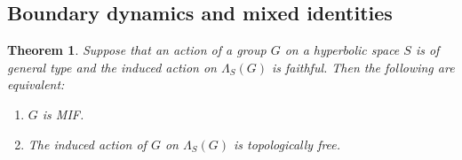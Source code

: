 \documentclass[11pt,letterpaper]{article}
\newtheorem{thm}{Theorem}[section]
\theoremstyle{definition}
\theoremstyle{remark}
\begin{document}
\subsection{Boundary dynamics and mixed identities}\label{boundary dynamics and mixed identities}

\begin{thm}\label{real main theorem}
Suppose that an action of a group $G$ on a hyperbolic space $S$ is of general type and the induced action on $\Lambda_S(G)$ is faithful. Then the following are equivalent:
\begin{enumerate}
    \item[(1)] $G$ is MIF.
     \item[(2)] The induced action of $G$ on $\Lambda_S(G)$ is topologically free.
\end{enumerate}
\end{thm}
\end{document}
